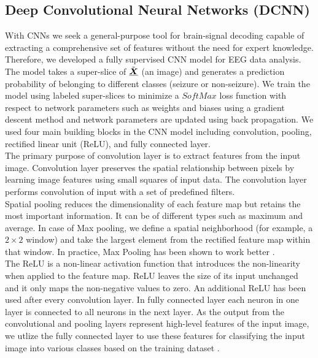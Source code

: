 \documentclass{article}
\begin{document}
\subsection{Deep Convolutional Neural Networks (DCNN)}
\indent With CNNs we seek a general-purpose tool for brain-signal decoding capable of extracting a comprehensive set of features without the need for expert knowledge. 
Therefore, we developed a fully supervised CNN model for EEG data analysis. The model takes a super-slice of $\Tilde{\boldsymbol{\underline{X}}}$ (an image) and generates a prediction probability
of belonging to different classes (seizure or non-seizure). We train the model using 
labeled super-slices to minimize a $SoftMax$ loss function
with respect to network parameters such as weights and biases using a gradient descent method and network parameters are updated using back propagation.
We  used four main building blocks in the CNN model including convolution,
pooling,
rectified linear unit (ReLU), and
fully connected layer.\\
\indent The primary purpose of convolution layer is to extract features from the input image. Convolution layer preserves the spatial relationship between pixels by learning image features using small squares of input data. The convolution layer performs convolution of input with a set of predefined filters.\\
\indent Spatial pooling reduces the dimensionality of each feature map but retains the most important information. It can be of different types such as maximum and average. In case of Max pooling, we define a spatial neighborhood (for example, a $2\times2$ window) and take the largest element from the rectified feature map within that window.
In practice, Max Pooling has been shown to work better \cite{hinton}.\\
\indent The ReLU is a non-linear activation function that introduces the non-linearity when applied to the feature map. ReLU leaves the size of its input unchanged and it only maps the non-negative values to zero. An additional ReLU has been used after every convolution layer. In fully connected layer each neuron in one layer is connected to all neurons in the next layer. As the output from the convolutional and pooling layers represent high-level features of the input image, we utlize  the fully connected layer to use these features for classifying the input image into various classes based on the training dataset \cite{hinton}.
\vspace{-4mm}
\end{document}

